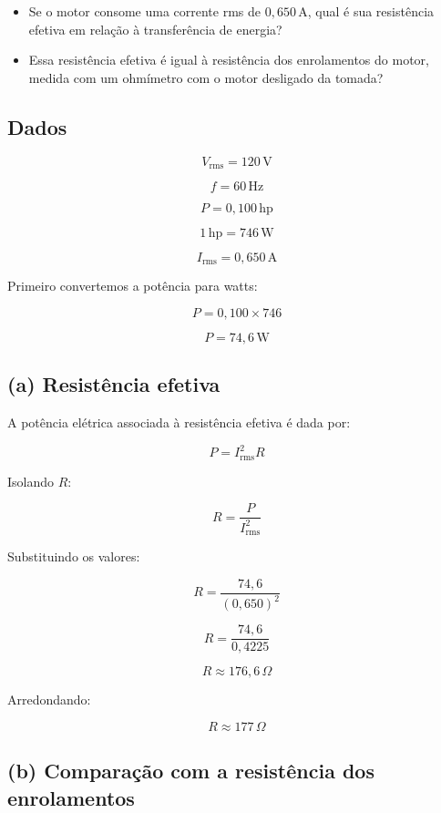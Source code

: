 \documentclass[12pt,a4paper]{article}
\begin{document}
\begin{itemize}
    \item[(a)] Se o motor consome uma corrente rms de
    $0,650\,\text{A}$, qual é sua resistência efetiva em relação
    à transferência de energia?
    
    \item[(b)] Essa resistência efetiva é igual à resistência dos
    enrolamentos do motor, medida com um ohmímetro com o motor
    desligado da tomada?
\end{itemize}

\subsection*{Dados}

\[
V_{\text{rms}} = 120\,\text{V}
\]

\[
f = 60\,\text{Hz}
\]

\[
P = 0,100\,\text{hp}
\]

\[
1\,\text{hp} = 746\,\text{W}
\]

\[
I_{\text{rms}} = 0,650\,\text{A}
\]

Primeiro convertemos a potência para watts:

\[
P = 0,100 \times 746
\]

\[
P = 74,6\,\text{W}
\]


\subsection*{(a) Resistência efetiva}

A potência elétrica associada à resistência efetiva é dada por:

\[
P = I_{\text{rms}}^2R
\]

Isolando $R$:

\[
R = \frac{P}{I_{\text{rms}}^2}
\]

Substituindo os valores:

\[
R = \frac{74,6}{(0,650)^2}
\]

\[
R = \frac{74,6}{0,4225}
\]

\[
R \approx 176,6\,\Omega
\]

Arredondando:

\[
\boxed{R \approx 177\,\Omega}
\]


\subsection*{(b) Comparação com a resistência dos enrolamentos}
\end{document}
